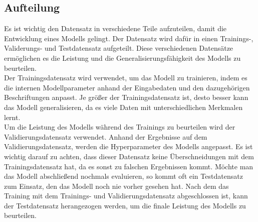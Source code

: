 \subsection{Aufteilung}
Es ist wichtig den Datensatz in verschiedene Teile aufzuteilen, damit die Entwicklung eines Modells gelingt. Der Datensatz wird dafür in einen Trainings-, Validerungs- und Testdatensatz aufgeteilt. Diese verschiedenen Datensätze ermöglichen es die Leistung und die Generalisierungsfähigkeit des \gls{Modell}s zu beurteilen. \\
Der Trainingsdatensatz wird verwendet, um das Modell zu trainieren, indem es die internen Modellparameter anhand der Eingabedaten und den dazugehörigen Beschriftungen anpasst. Je größer der Trainingsdatensatz ist, desto besser kann das \gls{Modell} generalisieren, da es viele Daten mit unterschiedlichen Merkmalen lernt. \\
Um die Leistung des \gls{Modell}s während des Trainings zu beurteilen wird der Validierungsdatensatz verwendet. Anhand der Ergebnisse auf dem Validierungsdatensatz, werden die Hyperparameter des \gls{Modell}s angepasst. Es ist wichtig darauf zu achten, dass dieser Datensatz keine Überschneidungen mit dem Trainingsdatensatz hat, da es sonst zu falschen Ergebnissen kommt. \cite[vgl.][]{Weidman2020}
Möchte man das Modell abschließend nochmals evaluieren, so kommt oft ein Testdatensatz zum Einsatz, den das \gls{Modell} noch nie vorher gesehen hat. Nach dem das Training mit dem Trainings- und Validierungsdatensatz abgeschlossen ist, kann der Testdatensatz herangezogen werden, um die finale Leistung des \glspl{Modell} zu beurteilen.